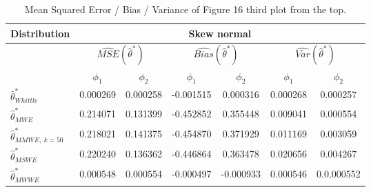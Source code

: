 \documentclass[
  11pt,
]{article}
\begin{document}
\begin{table}[h]
\centering
\begin{tabular}{|l|c|c|c|c|c|c|}
\hline
\multicolumn{1}{|c|}{\textbf{Distribution}} & \multicolumn{6}{c|}{\textbf{Skew normal}}                                                                                                                          \\ \hline
\textbf{}                                   & \multicolumn{2}{c|}{$\widehat{MSE}( \hat \theta^*)$} & \multicolumn{2}{c|}{$\widehat{Bias}( \hat \theta^*)$} & \multicolumn{2}{c|}{$\widehat{Var}( \hat \theta^*)$} \\ \hline
                                            & $\phi_1$                 & $\phi_2$                 & $\phi_1$                  & $\phi_2$                 & $\phi_1$                 & $\phi_2$                 \\ \hline
$\hat \theta^*_{Whittle}$                   & 0.000269                  & 0.000258                  & -0.001515                  & 0.000316                  & 0.000268                  & 0.000257                  \\ \hline
$\hat \theta^*_{MWE}$                       & 0.214071                  & 0.131399                  & -0.452852                   & 0.355448                 & 0.009041                  & 0.000554                  \\ \hline
$\hat \theta^*_{MMWE, \ k = 50}$            & 0.218021                  & 0.141375                  & -0.454870                  & 0.371929                  & 0.011169                  & 0.003059                  \\ \hline
$\hat \theta^*_{MSWE}$                      & 0.220240                  & 0.136362                  & -0.446864                  & 0.363478                  & 0.020656                  & 0.004267                  \\ \hline
$\hat \theta^*_{MWWE}$                      & 0.000548                  & 0.000554                  & -0.000497                  & -0.000933                  & 0.000546                  & 0.0.000552                  \\ \hline
\end{tabular}
\caption{Mean Squared Error / Bias / Variance of Figure 16 third plot from the top.}
\label{tab:AR2_skew_normal_table}
\end{table}
\end{document}
